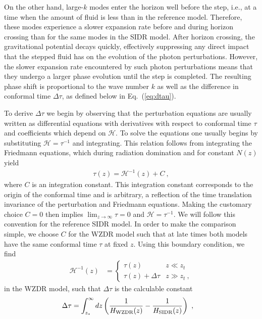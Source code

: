 \documentclass[aps,prd,twocolumn,nofootinbib,superscriptaddress]{revtex4}
\newcommand{\Eq}[1]{Eq.~(\ref{eq:#1})}
\begin{document}
On the other hand, large-$k$ modes enter the horizon well before the step, i.e., at a time when the amount of fluid is less than in the reference model. Therefore, these modes experience a slower expansion rate before and during horizon crossing than for the same modes in the SIDR model. After horizon crossing, the gravitational potential decays quickly, effectively suppressing any direct impact that the stepped fluid has on the evolution of the photon perturbations. However, the slower expansion rate encountered by such photon perturbations means that they undergo a larger phase evolution until the step is completed. The resulting phase shift is proportional to the wave number $k$ as well as the difference in conformal time $\Delta \tau$, as defined below in \Eq{dtau}.

To derive $\Delta \tau$ we begin by observing that the perturbation equations are usually written as differential equations with derivatives with respect to conformal time $\tau$ and coefficients which depend on $\mathcal{H}$. To solve the equations one usually begins by substituting $\mathcal{H}=\tau^{-1}$ and integrating. This relation follows from integrating the Friedmann equations, which during radiation domination and for constant $N(z)$ yield 
\begin{align}
	\tau(z) = \mathcal{H}^{-1}(z) + C~,
\end{align}
where $C$ is an integration constant. This integration constant corresponds to the origin of the conformal time and is arbitrary, a reflection of the time translation invariance of the perturbation and Friedmann equations. Making the customary choice $C=0$ then implies $\lim_{z \to \infty} \tau = 0$ and $\mathcal{H}=\tau^{-1}$. We will follow this convention for the reference SIDR model. In order to make the comparison simple, we choose $C$ for the WZDR model such that at late times both models have the same conformal time $\tau$ at fixed $z$.  Using this boundary condition, we find
\begin{align}
	\mathcal{H}^{-1}(z) & = \begin{cases}
		\tau(z) & z \ll z_t \\
		\tau(z) + \Delta\tau & z \gg z_t
		~,
	\end{cases}
\end{align}
in the WZDR model, such that $\Delta\tau$ is the calculable constant
\begin{align}
\label{eq:dtau}
\Delta \tau &= \int_{z_*}^\infty d z \left( \frac{1}{H_{\rm WZDR} (z)}-\frac{1}{H_{\rm SIDR} (z)} \right)
~,
\end{align}
\end{document}
